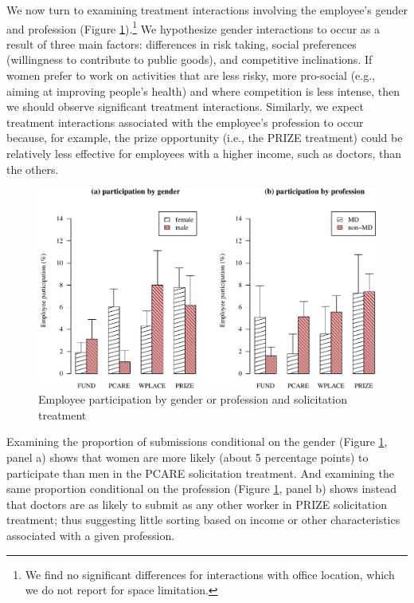 \documentclass[12pt, titlepage]{article}
\begin{document}
We now turn to examining treatment interactions involving the employee's
gender and profession (Figure \ref{interactions}).\footnote{We find no
  significant differences for interactions with office location, which
  we do not report for space limitation.} We hypothesize gender
interactions to occur as a result of three main factors: differences in
risk taking, social preferences (willingness to contribute to public
goods), and competitive inclinations. If women prefer to work on
activities that are less risky, more pro-social (e.g., aiming at
improving people's health) and where competition is less intense, then
we should observe significant treatment interactions. Similarly, we
expect treatment interactions associated with the employee's profession
to occur because, for example, the prize opportunity (i.e., the PRIZE
treatment) could be relatively less effective for employees with a
higher income, such as doctors, than the others.

\begin{figure} 
\caption{Employee participation by gender or profession and solicitation treatment}
  \label{interactions}
  \centering
  \includegraphics{figures/figure_interactions-1.pdf}
\end{figure}

Examining the proportion of submissions conditional on the gender
(Figure \ref{interactions}, panel a) shows that women are more likely
(about 5 percentage points) to participate than men in the PCARE
solicitation treatment. And examining the same proportion conditional on
the profession (Figure \ref{interactions}, panel b) shows instead that
doctors are as likely to submit as any other worker in PRIZE
solicitation treatment; thus suggesting little sorting based on income
or other characteristics associated with a given profession.
\end{document}
